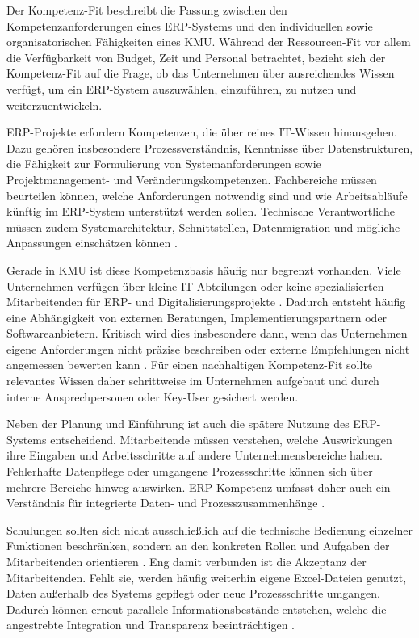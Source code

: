 
Der Kompetenz-Fit beschreibt die Passung zwischen den Kompetenzanforderungen eines ERP-Systems und den individuellen sowie 
organisatorischen Fähigkeiten eines KMU. Während der Ressourcen-Fit vor allem die Verfügbarkeit von Budget, Zeit und Personal 
betrachtet, bezieht sich der Kompetenz-Fit auf die Frage, ob das Unternehmen über ausreichendes Wissen verfügt, um ein ERP-System 
auszuwählen, einzuführen, zu nutzen und weiterzuentwickeln.

ERP-Projekte erfordern Kompetenzen, die über reines IT-Wissen hinausgehen. Dazu gehören insbesondere Prozessverständnis, Kenntnisse 
über Datenstrukturen, die Fähigkeit zur Formulierung von Systemanforderungen sowie Projektmanagement- und Veränderungskompetenzen. 
Fachbereiche müssen beurteilen können, welche Anforderungen notwendig sind und wie Arbeitsabläufe künftig im ERP-System unterstützt 
werden sollen. Technische Verantwortliche müssen zudem Systemarchitektur, Schnittstellen, Datenmigration und mögliche Anpassungen 
einschätzen können \parencite{Alaskari2021,Leyh2015}.

Gerade in KMU ist diese Kompetenzbasis häufig nur begrenzt vorhanden. Viele Unternehmen verfügen über kleine IT-Abteilungen oder keine 
spezialisierten Mitarbeitenden für ERP- und Digitalisierungsprojekte \parencite{Faruque2024}. Dadurch entsteht häufig eine Abhängigkeit 
von externen Beratungen, Implementierungspartnern oder Softwareanbietern. Kritisch wird dies insbesondere dann, wenn das Unternehmen 
eigene Anforderungen nicht präzise beschreiben oder externe Empfehlungen nicht angemessen bewerten kann \parencite{Leyh2015,Leyh2017}. 
Für einen nachhaltigen Kompetenz-Fit sollte relevantes Wissen daher schrittweise im Unternehmen aufgebaut und durch interne 
Ansprechpersonen oder Key-User gesichert werden.

Neben der Planung und Einführung ist auch die spätere Nutzung des ERP-Systems entscheidend. Mitarbeitende müssen verstehen, welche 
Auswirkungen ihre Eingaben und Arbeitsschritte auf andere Unternehmensbereiche haben. Fehlerhafte Datenpflege oder umgangene Prozessschritte 
können sich über mehrere Bereiche hinweg auswirken. ERP-Kompetenz umfasst daher auch ein Verständnis für integrierte Daten- und 
Prozesszusammenhänge \parencite{Leyh2015,Alaskari2021}.

Schulungen sollten sich nicht ausschließlich auf die technische Bedienung einzelner Funktionen beschränken, sondern an den konkreten 
Rollen und Aufgaben der Mitarbeitenden orientieren \parencite{Noudoostbeni2009,Faruque2024}. Eng damit verbunden ist die Akzeptanz der 
Mitarbeitenden. Fehlt sie, werden häufig weiterhin eigene Excel-Dateien genutzt, Daten außerhalb des Systems gepflegt oder neue 
Prozessschritte umgangen. Dadurch können erneut parallele Informationsbestände entstehen, welche die angestrebte Integration und 
Transparenz beeinträchtigen \parencite{Leyh2015,Leyh2019}.

